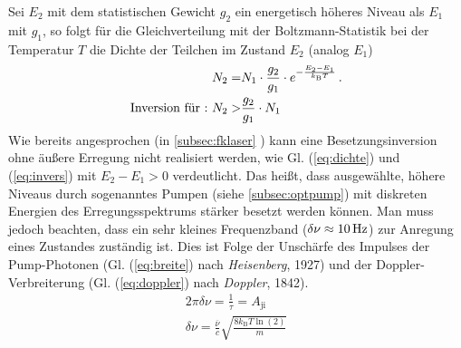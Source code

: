 \documentclass[numbers=noenddot,12pt,a4paper]{scrartcl}
\newcommand{\ix}[1]{_\text{#1}}
\newcommand{\tilt}[1]{\textit{#1}}
\newcommand{\euler}{\mathnormal{e}}
\begin{document}
Sei $E\ix{2}$ mit dem statistischen Gewicht $g\ix{2}$ ein energetisch höheres Niveau als $E\ix{1}$ mit $g\ix{1}$, so folgt für die Gleichverteilung mit der Boltzmann-Statistik bei der Temperatur $T$ die Dichte der Teilchen im Zustand $E\ix{2}$ (analog $E\ix{1}$)
\begin{align}
	N\ix{2}=&N\ix{1}\cdot\frac{g\ix{2}}{g\ix{1}}\cdot\euler^{-\frac{E\ix{2}-E\ix{1}}{k\ix{B}T}} \,. \label{eq:dichte} \\
	\text{Inversion für :} \,\, N\ix{2}>&\frac{g\ix{2}}{g\ix{1}}\cdot N\ix{1} \label{eq:invers}
	\end{align}
Wie bereits angesprochen (in \ref{subsec:fklaser} ) kann eine Besetzungsinversion ohne äußere Erregung nicht realisiert werden, wie Gl. (\ref{eq:dichte}) und (\ref{eq:invers}) mit $E\ix{2}-E\ix{1}>0$ verdeutlicht. Das heißt, dass ausgewählte, höhere Niveaus durch sogenanntes Pumpen (siehe \ref{subsec:optpump}) mit diskreten Energien des Erregungsspektrums stärker besetzt werden können. Man muss jedoch beachten, dass ein sehr kleines Frequenzband ($\delta\nu\approx\unit[10]{Hz}$) zur Anregung eines Zustandes zuständig ist. Dies ist Folge der Unschärfe des Impulses der Pump-Photonen (Gl. (\ref{eq:breite}) nach \tilt{Heisenberg}, 1927) und der Doppler-Verbreiterung (Gl. (\ref{eq:doppler}) nach \tilt{Doppler}, 1842).
\begin{align}
	2\pi\delta\nu=\frac{1}{\tau}=A\ix{ji} \label{eq:breite}\\
	\delta\nu=\frac{\overline{\nu}}{c}\sqrt{\frac{8k\ix{B}T\ln\left(2\right)}{m}} \label{eq:doppler}
\end{align}
\end{document}
